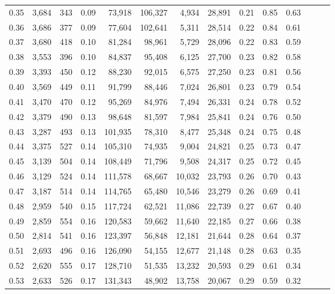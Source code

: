 \begin{tabular}{rrrrrrrrrrrrrr}
0.35 &  3,684 &  343 &  0.09 &   73,918 &  106,327 &   4,934 &  28,891 &  0.21 &  0.85 &      0.63 \\
0.36 &  3,686 &  377 &  0.09 &   77,604 &  102,641 &   5,311 &  28,514 &  0.22 &  0.84 &      0.61 \\
0.37 &  3,680 &  418 &  0.10 &   81,284 &   98,961 &   5,729 &  28,096 &  0.22 &  0.83 &      0.59 \\
0.38 &  3,553 &  396 &  0.10 &   84,837 &   95,408 &   6,125 &  27,700 &  0.23 &  0.82 &      0.58 \\
0.39 &  3,393 &  450 &  0.12 &   88,230 &   92,015 &   6,575 &  27,250 &  0.23 &  0.81 &      0.56 \\
0.40 &  3,569 &  449 &  0.11 &   91,799 &   88,446 &   7,024 &  26,801 &  0.23 &  0.79 &      0.54 \\
0.41 &  3,470 &  470 &  0.12 &   95,269 &   84,976 &   7,494 &  26,331 &  0.24 &  0.78 &      0.52 \\
0.42 &  3,379 &  490 &  0.13 &   98,648 &   81,597 &   7,984 &  25,841 &  0.24 &  0.76 &      0.50 \\
0.43 &  3,287 &  493 &  0.13 &  101,935 &   78,310 &   8,477 &  25,348 &  0.24 &  0.75 &      0.48 \\
0.44 &  3,375 &  527 &  0.14 &  105,310 &   74,935 &   9,004 &  24,821 &  0.25 &  0.73 &      0.47 \\
0.45 &  3,139 &  504 &  0.14 &  108,449 &   71,796 &   9,508 &  24,317 &  0.25 &  0.72 &      0.45 \\
0.46 &  3,129 &  524 &  0.14 &  111,578 &   68,667 &  10,032 &  23,793 &  0.26 &  0.70 &      0.43 \\
0.47 &  3,187 &  514 &  0.14 &  114,765 &   65,480 &  10,546 &  23,279 &  0.26 &  0.69 &      0.41 \\
0.48 &  2,959 &  540 &  0.15 &  117,724 &   62,521 &  11,086 &  22,739 &  0.27 &  0.67 &      0.40 \\
0.49 &  2,859 &  554 &  0.16 &  120,583 &   59,662 &  11,640 &  22,185 &  0.27 &  0.66 &      0.38 \\
0.50 &  2,814 &  541 &  0.16 &  123,397 &   56,848 &  12,181 &  21,644 &  0.28 &  0.64 &      0.37 \\
0.51 &  2,693 &  496 &  0.16 &  126,090 &   54,155 &  12,677 &  21,148 &  0.28 &  0.63 &      0.35 \\
0.52 &  2,620 &  555 &  0.17 &  128,710 &   51,535 &  13,232 &  20,593 &  0.29 &  0.61 &      0.34 \\
0.53 &  2,633 &  526 &  0.17 &  131,343 &   48,902 &  13,758 &  20,067 &  0.29 &  0.59 &      0.32 \\

\end{tabular}

